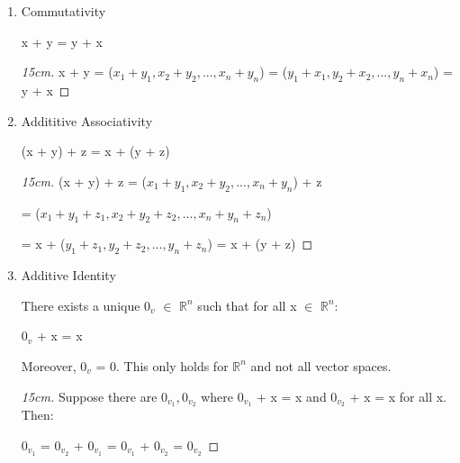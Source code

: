     \begin{enumerate}[label=(\alph*), leftmargin=2cm, itemsep=0.1cm]
        \item {\color{lgreen} Commutativity}
        
            \hspace{0.5cm}
            x + y = y + x

            \begin{proof}[15cm]
                x + y
                = ($x_1+y_1,x_2+y_2,...,x_n+y_n$)
                = ($y_1+x_1,y_2+x_2,...,y_n+x_n$)
                = y + x
            \end{proof}

        \item {\color{lgreen} Addititive Associativity}
        
            \hspace{0.5cm}
            (x + y) + z = x + (y + z)

            \begin{proof}[15cm]
                (x + y) + z
                = ($x_1+y_1,x_2+y_2,...,x_n+y_n$) + z

                \hspace{2.1cm}
                = ($x_1+y_1+z_1,x_2+y_2+z_2,...,x_n+y_n+z_n$)

                \hspace{2.1cm}
                = x + ($y_1+z_1,y_2+z_2,...,y_n+z_n$)
                = x + (y + z)
            \end{proof}

        \item {\color{lgreen} Additive Identity}
        
            There exists a unique $0_v$ $\in$ $\mathbb{R}^n$
            such that for all x $\in$ $\mathbb{R}^n$:

            \hspace{0.5cm}
            $0_v$ + x = x

            Moreover, $0_v$ = 0.
            This only holds for $\mathbb{R}^n$ and not all vector spaces.

            \begin{proof}[15cm]
                Suppose there are $0_{v_1},0_{v_2}$ where
                $0_{v_1}$ + x = x and $0_{v_2}$ + x = x for all x. Then:

                \hspace{0.5cm}
                $0_{v_1}$
                = $0_{v_2}$ + $0_{v_1}$
                = $0_{v_1}$ + $0_{v_2}$
                = $0_{v_2}$


\end{proof}
\end{enumerate}
